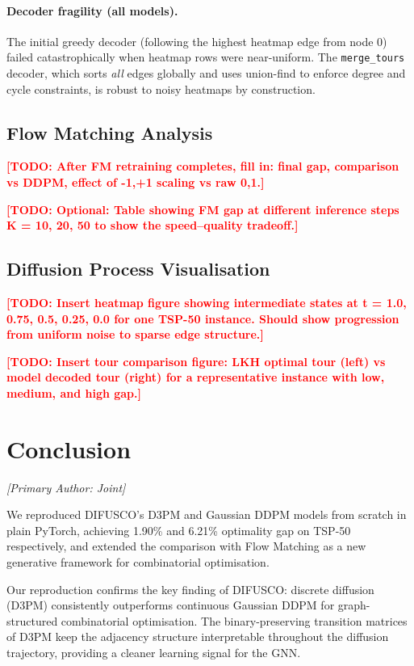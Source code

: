\documentclass[11pt,a4paper]{article}
\newcommand{\TODO}[1]{\textcolor{red}{\textbf{[TODO: #1]}}}
\begin{document}
\paragraph{Decoder fragility (all models).}
The initial greedy decoder (following the highest heatmap edge from node 0) failed
catastrophically when heatmap rows were near-uniform. The \texttt{merge\_tours} decoder,
which sorts \emph{all} edges globally and uses union-find to enforce degree and cycle
constraints, is robust to noisy heatmaps by construction.

\subsection{Flow Matching Analysis}
\label{sec:fm_analysis}
\TODO{After FM retraining completes, fill in: final gap, comparison vs DDPM,
effect of {-1,+1} scaling vs raw {0,1}.}

\TODO{Optional: Table showing FM gap at different inference steps K = 10, 20, 50 to show
the speed--quality tradeoff.}

\subsection{Diffusion Process Visualisation}
\TODO{Insert heatmap figure showing intermediate states at t = 1.0, 0.75, 0.5, 0.25, 0.0
for one TSP-50 instance. Should show progression from uniform noise to sparse edge structure.}

\TODO{Insert tour comparison figure: LKH optimal tour (left) vs model decoded tour (right)
for a representative instance with low, medium, and high gap.}


\section{Conclusion}
\label{sec:conclusion}
\textit{[Primary Author: Joint]}

We reproduced DIFUSCO's D3PM and Gaussian DDPM models from scratch in plain PyTorch,
achieving 1.90\% and 6.21\% optimality gap on TSP-50 respectively, and extended the
comparison with Flow Matching as a new generative framework for combinatorial optimisation.

Our reproduction confirms the key finding of DIFUSCO: discrete diffusion (D3PM) consistently
outperforms continuous Gaussian DDPM for graph-structured combinatorial optimisation.
The binary-preserving transition matrices of D3PM keep the adjacency structure interpretable
throughout the diffusion trajectory, providing a cleaner learning signal for the GNN.
\end{document}
